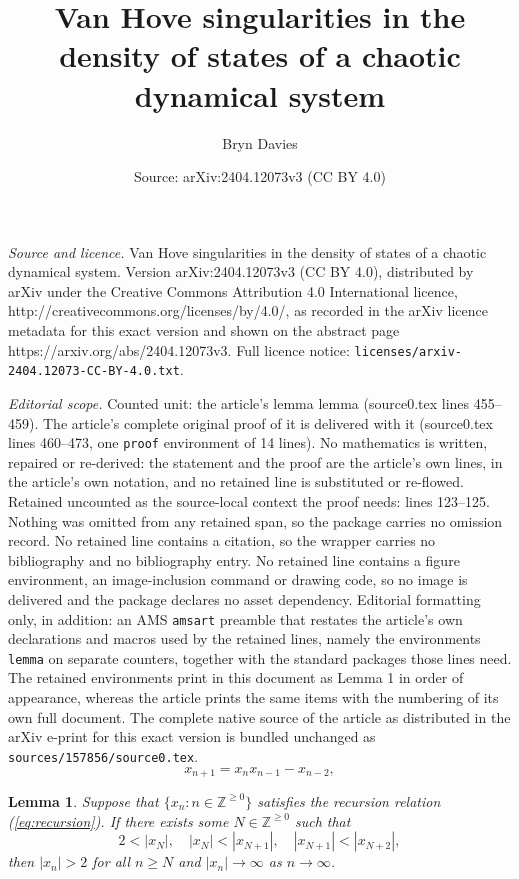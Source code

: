 \documentclass[10pt,a4paper]{amsart}
\title{Van Hove singularities in the density of states of a chaotic dynamical system}
\author{Bryn Davies}
\date{Source: arXiv:2404.12073v3 (CC BY 4.0)}
\newtheorem{lemma}{Lemma}
\newcommand{\Znn}{\mathbb{Z}^{\geq0}}
\begin{document}
\maketitle

\noindent\emph{Source and licence.} Van Hove singularities in the density of states of a chaotic dynamical system. Version arXiv:2404.12073v3 (CC BY 4.0), distributed by arXiv under the Creative Commons Attribution 4.0 International licence, http://creativecommons.org/licenses/by/4.0/, as recorded in the arXiv licence metadata for this exact version and shown on the abstract page https://arxiv.org/abs/2404.12073v3. Full licence notice: \texttt{licenses/arxiv-2404.12073-CC-BY-4.0.txt}.\par\smallskip

\noindent\textit{Editorial scope.} Counted unit: the article's lemma lemma (source0.tex lines 455--459). The article's complete original proof of it is delivered with it (source0.tex lines 460--473, one \texttt{proof} environment of 14 lines). No mathematics is written, repaired or re-derived: the statement and the proof are the article's own lines, in the article's own notation, and no retained line is substituted or re-flowed.  Retained uncounted as the source-local context the proof needs: lines 123--125.  Nothing was omitted from any retained span, so the package carries no omission record.  No retained line contains a citation, so the wrapper carries no bibliography and no bibliography entry.  No retained line contains a figure environment, an image-inclusion command or drawing code, so no image is delivered and the package declares no asset dependency.  Editorial formatting only, in addition: an AMS \texttt{amsart} preamble that restates the article's own declarations and macros used by the retained lines, namely the environments \texttt{lemma} on separate counters, together with the standard packages those lines need.  The retained environments print in this document as Lemma 1 in order of appearance, whereas the article prints the same items with the numbering of its own full document.  The complete native source of the article as distributed in the arXiv e-print for this exact version is bundled unchanged as \texttt{sources/157856/source0.tex}.
\begin{equation} \label{eq:recursion}
	x_{n+1} = x_n x_{n-1} - x_{n-2},
\end{equation}

\begin{lemma} %
	Suppose that $\{x_n:n\in\Znn\}$ satisfies the recursion relation (\ref{eq:recursion}). If there exists some $N\in\Znn$ such that 
	$$ 2<|x_N|, \quad |x_N|<|x_{N+1}|, \quad |x_{N+1}|<|x_{N+2}|,$$
	then $|x_n|>2$ for all $n\geq N$ and $|x_n|\to\infty$ as $n\to\infty$.
\end{lemma}
\end{document}
